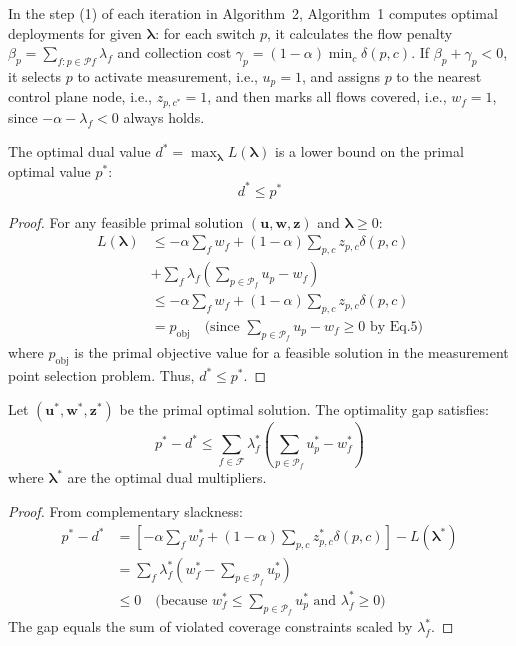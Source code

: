 In the step (1) of each iteration in Algorithm~2, Algorithm~1 computes optimal deployments for given $\boldsymbol{\lambda}$: for each switch $p$, it calculates the flow penalty $\beta_p = \sum_{f: p \in \mathcal{P}f} \lambda_f$ and collection cost $\gamma_p = (1-\alpha) \min_c \delta(p,c)$. If $\beta_p + \gamma_p < 0$, it selects $p$ to activate measurement, i.e., $u_p=1$, and assigns $p$ to the nearest control plane node, i.e., $z_{p,c^*}=1$, and then marks all flows covered, i.e., $w_f=1$, since $-\alpha - \lambda_f < 0$ always holds.

\begin{theorem}
The optimal dual value \(d^* = \max_{\boldsymbol{\lambda}} L(\boldsymbol{\lambda})\) is a lower bound on the primal optimal value \(p^*\):
\[
d^* \leq p^*
\]
\end{theorem}

\begin{proof}
For any feasible primal solution \((\mathbf{u},\mathbf{w},\mathbf{z})\) and \(\boldsymbol{\lambda} \geq 0\):
\[
\begin{aligned}
L(\boldsymbol{\lambda}) &\leq -\alpha \sum_f w_f + (1-\alpha) \sum_{p,c} z_{p,c} \delta(p,c) \\
&+ \sum_f \lambda_f \left( \sum_{p \in \mathcal{P}_f} u_p - w_f \right) \\
&\leq -\alpha \sum_f w_f + (1-\alpha) \sum_{p,c} z_{p,c} \delta(p,c) \\
&= p_{\text{obj}} \quad \text{(since } \sum_{p \in \mathcal{P}_f} u_p - w_f \geq 0 \text{ by Eq.5)}
\end{aligned}
\]
where $p_{\text{obj}}$ is the primal objective value for a feasible solution in the measurement point selection problem. Thus, \(d^* \leq p^*\).
\end{proof}

\begin{theorem}
Let \((\mathbf{u}^*,\mathbf{w}^*,\mathbf{z}^*)\) be the primal optimal solution. The optimality gap satisfies:
\[
p^* - d^* \leq \sum_{f \in \mathcal{F}} \lambda_f^* \left( \sum_{p \in \mathcal{P}_f} u_p^* - w_f^* \right)
\]
where \(\boldsymbol{\lambda}^*\) are the optimal dual multipliers.
\end{theorem}

\begin{proof}
From complementary slackness:
\[
\begin{aligned}
p^* - d^* &= \left[ -\alpha \sum_f w_f^* + (1-\alpha) \sum_{p,c} z_{p,c}^* \delta(p,c) \right] - L(\boldsymbol{\lambda}^*) \\
&= \sum_f \lambda_f^* \left( w_f^* - \sum_{p \in \mathcal{P}_f} u_p^* \right) \\
&\leq 0 \quad \text{(because } w_f^* \leq \sum_{p \in \mathcal{P}_f} u_p^* \text{ and } \lambda_f^* \geq 0\text{)}
\end{aligned}
\]
The gap equals the sum of violated coverage constraints scaled by \(\lambda_f^*\).
\end{proof}

